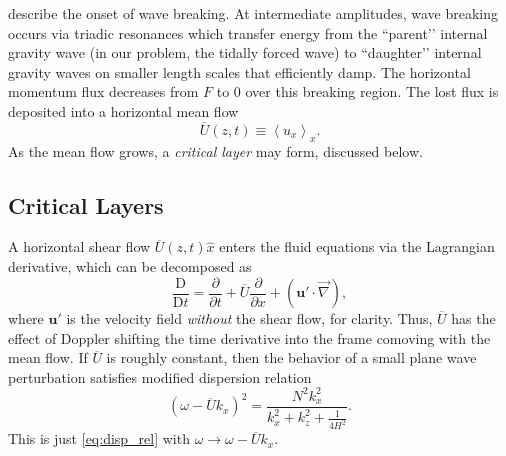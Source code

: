 \documentclass[
        fleqn,
        usenatbib,
    ]{mnras}
\newcommand*{\pd}[2]{\frac{\partial#1}{\partial#2}}
\newcommand*{\md}[2]{\frac{\mathrm{D}#1}{\mathrm{D}#2}}
\newcommand*{\ev}[1]{\left\langle#1\right\rangle}
\newcommand*{\p}[1]{\left(#1\right)}
\newcommand*{\bm}[1]{\mathbf{#1}}
\begin{document}


\citealp{drazin, klostermeyer, winters1994} describe the onset of wave breaking.
At intermediate amplitudes, wave breaking occurs via triadic resonances which
transfer energy from the ``parent’’ internal gravity wave (in our problem, the
tidally forced wave) to ``daughter’’ internal gravity waves on smaller length
scales that efficiently damp. The horizontal momentum flux decreases from $F$ to
$0$ over this breaking region. The lost flux is deposited into a horizontal mean
flow
\begin{equation}
    \overline{U}(z, t) \equiv \ev{u_x}_x.\label{eq:mean_flow}
\end{equation}
As the mean flow grows, a \emph{critical layer} may form, discussed below.

\subsection{Critical Layers}\label{ss:crit_layer}

A horizontal shear flow $\overline{U}(z, t)\hat{x}$ enters the fluid equations
via the Lagrangian derivative, which can be decomposed as
\begin{equation}
    \md{}{t} = \pd{}{t} + \overline{U} \pd{}{x} + \p{\bm{u}' \cdot \vec{\nabla}},
\end{equation}
where $\bm{u}'$ is the velocity field \emph{without} the shear flow, for
clarity. Thus, $\overline{U}$ has the effect of Doppler shifting the time
derivative into the frame comoving with the mean flow. If $\overline{U}$ is
roughly constant, then the behavior of a small plane wave perturbation satisfies
modified dispersion relation
\begin{equation}
    \p{\omega - \overline{U}k_x}^2 =
        \frac{N^2k_{x}^2}{k_{x}^2 + k_{z}^2 + \frac{1}{4H^2}}.
        \label{eq:disp_rel_U}
\end{equation}
This is just \autoref{eq:disp_rel} with $\omega \to \omega - \overline{U}k_x$.
\end{document}
